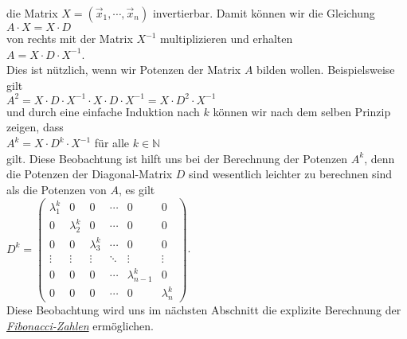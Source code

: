 die Matrix $X = (\vec{x}_1, \cdots, \vec{x}_n)$ invertierbar.  Damit k\"onnen wir die Gleichung
\\[0.2cm]
\hspace*{1.3cm}
$A \cdot X = X \cdot D$
\\[0.2cm]
von rechts mit der Matrix $X^{-1}$ multiplizieren und erhalten
\\[0.2cm]
\hspace*{1.3cm}
$A = X \cdot D \cdot X^{-1}$.
\\[0.2cm]
Dies ist n\"utzlich, wenn wir Potenzen der Matrix $A$ bilden wollen.  Beispielsweise gilt
\\[0.2cm]
\hspace*{1.3cm}
$A^2 = X \cdot D \cdot X^{-1} \cdot X \cdot D \cdot X^{-1} = X \cdot D^2 \cdot X^{-1}$
\\[0.2cm]
und durch eine einfache Induktion nach $k$ k\"onnen wir nach dem selben Prinzip zeigen, dass
\\[0.2cm]
\hspace*{1.3cm}
$A^k = X \cdot D^k \cdot X^{-1}$ \quad f\"ur alle $k \in \mathbb{N}$
\\[0.2cm]
gilt.  Diese Beobachtung ist hilft uns bei der Berechnung der Potenzen $A^k$, denn die Potenzen der
Diagonal-Matrix $D$ sind wesentlich  leichter zu berechnen sind als die Potenzen von $A$, es gilt
\\[0.2cm]
\hspace*{1.3cm}
$D^k = \left(
  \begin{array}{llllll}
    \lambda_1^k & 0         & 0         & \cdots & 0 & 0 \\ 
    0           & \lambda_2^k & 0         & \cdots & 0 & 0 \\
    0           & 0         & \lambda_3^k & \cdots & 0 & 0 \\
    \vdots      & \vdots    & \vdots    & \ddots & \vdots & \vdots \\
    0           & 0         & 0         & \cdots  & \lambda_{n-1}^k & 0 \\
    0           & 0         & 0         & \cdots & 0 & \lambda_n^k 
  \end{array}
\right)
$.
\\[0.2cm]
Diese Beobachtung wird uns im n\"achsten Abschnitt die explizite Berechnung der
\href{http://de.wikipedia.org/wiki/Fibonacci-Folge}{\emph{Fibonacci-Zahlen}} erm\"oglichen. 

